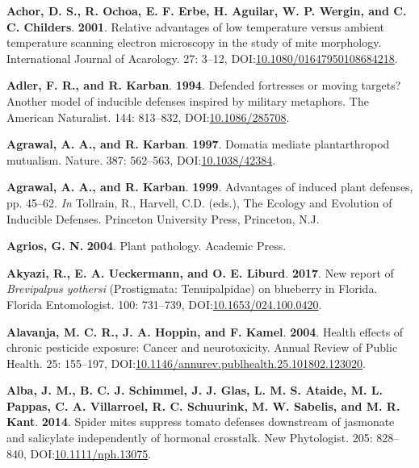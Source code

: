 \documentclass[12pt,final,CPage]{ufthesis}
\newlength{\cslhangindent}
\newenvironment{CSLReferences}[2] %
{%
	\setlength{\parindent}{0pt}
	\ifodd #1 \everypar{\setlength{\hangindent}{\cslhangindent}}\ignorespaces\fi
	\ifnum #2 > 0
	\setlength{\parskip}{#2\baselineskip}
	\fi
}%
{}
\begin{document}
{\begin{CSLReferences}{1}{0}
  \leavevmode{}%
  \textbf{Achor, D. S., R. Ochoa, E. F. Erbe, H. Aguilar, W. P. Wergin, and C. C. Childers}. \textbf{2001}. Relative advantages of low temperature versus ambient temperature scanning electron microscopy in the study of mite morphology. International Journal of Acarology. 27: 3--12, DOI:\href{https://doi.org/10.1080/01647950108684218}{10.1080/01647950108684218}.

  \leavevmode{}%
  \textbf{Adler, F. R., and R. Karban}. \textbf{1994}. Defended fortresses or moving targets? Another model of inducible defenses inspired by military metaphors. The American Naturalist. 144: 813--832, DOI:\href{https://doi.org/10.1086/285708}{10.1086/285708}.

  \leavevmode{}%
  \textbf{Agrawal, A. A., and R. Karban}. \textbf{1997}. Domatia mediate plantarthropod mutualism. Nature. 387: 562--563, DOI:\href{https://doi.org/10.1038/42384}{10.1038/42384}.

  \leavevmode{}%
  \textbf{Agrawal, A. A., and R. Karban}. \textbf{1999}. Advantages of induced plant defenses, pp. 45--62. \emph{In} Tollrain, R., Harvell, C.D. (eds.), The Ecology and Evolution of Inducible Defenses. Princeton University Press, Princeton, N.J.

  \leavevmode{}%
  \textbf{Agrios, G. N.} \textbf{2004}. Plant pathology. Academic Press.

  \leavevmode{}%
  \textbf{Akyazi, R., E. A. Ueckermann, and O. E. Liburd}. \textbf{2017}. New report of {\emph{Brevipalpus yothersi}} ({Prostigmata}: {Tenuipalpidae}) on blueberry in {Florida}. Florida Entomologist. 100: 731--739, DOI:\href{https://doi.org/10.1653/024.100.0420}{10.1653/024.100.0420}.

  \leavevmode{}%
  \textbf{Alavanja, M. C. R., J. A. Hoppin, and F. Kamel}. \textbf{2004}. Health effects of chronic pesticide exposure: Cancer and neurotoxicity. Annual Review of Public Health. 25: 155--197, DOI:\href{https://doi.org/10.1146/annurev.publhealth.25.101802.123020}{10.1146/annurev.publhealth.25.101802.123020}.

  \leavevmode{}%
  \textbf{Alba, J. M., B. C. J. Schimmel, J. J. Glas, L. M. S. Ataide, M. L. Pappas, C. A. Villarroel, R. C. Schuurink, M. W. Sabelis, and M. R. Kant}. \textbf{2014}. Spider mites suppress tomato defenses downstream of jasmonate and salicylate independently of hormonal crosstalk. New Phytologist. 205: 828--840, DOI:\href{https://doi.org/10.1111/nph.13075}{10.1111/nph.13075}.


\end{CSLReferences}}
\end{document}

